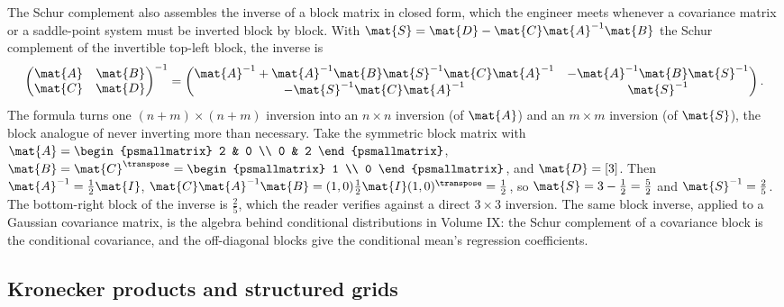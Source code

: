 \begin{example}
The Schur complement also assembles the inverse of a block matrix in
closed form, which the engineer meets whenever a covariance matrix or a
saddle-point system must be inverted block by block. With $\mat{S} =
\mat{D} - \mat{C}\mat{A}^{-1}\mat{B}$ the Schur complement of the
invertible top-left block, the inverse is
\[
\begin{pmatrix} \mat{A} & \mat{B} \\ \mat{C} & \mat{D} \end{pmatrix}^{-1}
= \begin{pmatrix}
\mat{A}^{-1} + \mat{A}^{-1}\mat{B}\mat{S}^{-1}\mat{C}\mat{A}^{-1} &
-\mat{A}^{-1}\mat{B}\mat{S}^{-1} \\
-\mat{S}^{-1}\mat{C}\mat{A}^{-1} & \mat{S}^{-1}
\end{pmatrix}.
\]
The formula turns one $(n+m) \times (n+m)$ inversion into an $n \times
n$ inversion (of $\mat{A}$) and an $m \times m$ inversion (of $\mat{S}$),
the block analogue of never inverting more than necessary. Take the
symmetric block matrix with $\mat{A} = \begin{psmallmatrix} 2 & 0 \\ 0 &
2 \end{psmallmatrix}$, $\mat{B} = \mat{C}^{\transpose} =
\begin{psmallmatrix} 1 \\ 0 \end{psmallmatrix}$, and $\mat{D} = [3]$.
Then $\mat{A}^{-1} = \tfrac{1}{2}\mat{I}$, $\mat{C}\mat{A}^{-1}\mat{B} =
(1, 0)\tfrac{1}{2}\mat{I}(1, 0)^{\transpose} = \tfrac{1}{2}$, so
$\mat{S} = 3 - \tfrac{1}{2} = \tfrac{5}{2}$ and $\mat{S}^{-1} =
\tfrac{2}{5}$. The bottom-right block of the inverse is $\tfrac{2}{5}$,
which the reader verifies against a direct $3 \times 3$ inversion. The
same block inverse, applied to a Gaussian covariance matrix, is the
algebra behind conditional distributions in Volume IX: the Schur
complement of a covariance block is the conditional covariance, and the
off-diagonal blocks give the conditional mean's regression coefficients.
\end{example}

\subsection{Kronecker products and structured grids}

